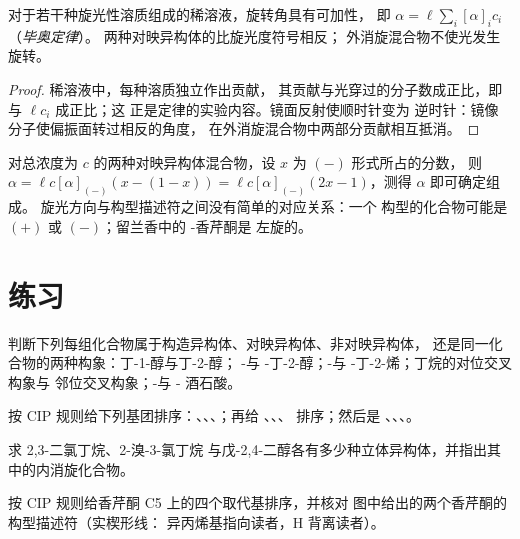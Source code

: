 \begin{proposition}[毕奥定律]\label{prop:b1:stereochemistry-in-depth:biot}
对于若干种旋光性溶质组成的稀溶液，旋转角具有可加性，
即 $\alpha = \ell\sum_i [\alpha]_i c_i$（\emph{毕奥定律}）。
两种对映异构体的比旋光度符号相反；
外消旋混合物不使光发生旋转。
\end{proposition}

\begin{proof}
稀溶液中，每种溶质独立作出贡献，
其贡献与光穿过的分子数成正比，即与 $\ell c_i$ 成正比；这
正是定律的实验内容。镜面反射使顺时针变为
逆时针：镜像分子使偏振面转过相反的角度，
在外消旋混合物中两部分贡献相互抵消。
\end{proof}

对总浓度为 $c$ 的两种对映异构体混合物，设 $x$ 为 $(-)$ 形式所占的分数，
则 $\alpha = \ell c[\alpha]_{(-)}(x - (1 - x)) =
\ell c[\alpha]_{(-)}(2x - 1)$，测得 $\alpha$ 即可确定组成。
旋光方向与构型描述符之间没有简单的对应关系：一个
 构型的化合物可能是 $(+)$ 或 $(-)$；留兰香中的 -香芹酮是
左旋的。

\section{练习}

\begin{exercise}[$\star$]\label{exo:b1:stereochemistry-in-depth:1}
判断下列每组化合物属于构造异构体、对映异构体、非对映异构体，
还是同一化合物的两种构象：丁-1-醇与丁-2-醇；
-与 -丁-2-醇；-与 -丁-2-烯；丁烷的对位交叉构象与
邻位交叉构象；-与 -
酒石酸。
\end{exercise}

\begin{exercise}[$\star$]\label{exo:b1:stereochemistry-in-depth:2}
按 CIP 规则给下列基团排序：、、、；再给
、、、 排序；然后是
、、、。
\end{exercise}

\begin{exercise}[$\star$]\label{exo:b1:stereochemistry-in-depth:3}
求 2,3-二氯丁烷、2-溴-3-氯丁烷
与戊-2,4-二醇各有多少种立体异构体，并指出其中的内消旋化合物。
\end{exercise}

\begin{exercise}[$\star$]\label{exo:b1:stereochemistry-in-depth:4}
按 CIP 规则给香芹酮 C5 上的四个取代基排序，并核对
图中给出的两个香芹酮的构型描述符（实楔形线：
异丙烯基指向读者，H 背离读者）。
\end{exercise}

